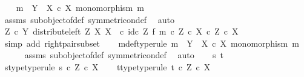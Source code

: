 \begin{isabellebody}
\ \ \isamarkupfalse%
\ {\isachardoublequoteopen}m\ {\isacharcolon}{\kern0pt}\ Y\ {\isasymrightarrow}\ X\ {\isasymtimes}\isactrlsub c\ X{\isachardoublequoteclose}\ {\isachardoublequoteopen}monomorphism\ m{\isachardoublequoteclose}\isanewline
\ \ \ \ \isamarkupfalse%
\ assms\ subobject{\isacharunderscore}{\kern0pt}of{\isacharunderscore}{\kern0pt}def{}\ symmetric{\isacharunderscore}{\kern0pt}on{\isacharunderscore}{\kern0pt}def\ \isamarkupfalse%
\ auto\isanewline
\ \ \isamarkupfalse%
\ \isamarkupfalse%
\ {\isachardoublequoteopen}{\isacharparenleft}{\kern0pt}Z\ {\isasymtimes}\isactrlsub c\ Y{\isacharcomma}{\kern0pt}\ distribute{\isacharunderscore}{\kern0pt}left\ Z\ X\ X\ \ {\isasymcirc}\isactrlsub c\ {\isacharparenleft}{\kern0pt}id\isactrlsub c\ Z\ {\isasymtimes}\isactrlsub f\ m{\isacharparenright}{\kern0pt}{\isacharparenright}{\kern0pt}\ {\isasymsubseteq}\isactrlsub c\ {\isacharparenleft}{\kern0pt}Z\ {\isasymtimes}\isactrlsub c\ X{\isacharparenright}{\kern0pt}\ {\isasymtimes}\isactrlsub c\ Z\ {\isasymtimes}\isactrlsub c\ X{\isachardoublequoteclose}\isanewline
\ \ \ \ \isamarkupfalse%
\ {\isacharparenleft}{\kern0pt}simp\ add{\isacharcolon}{\kern0pt}\ right{\isacharunderscore}{\kern0pt}pair{\isacharunderscore}{\kern0pt}subset{\isacharparenright}{\kern0pt}\isanewline
{}\isamarkupfalse%
\isanewline
\ \ \isamarkupfalse%
\ m{\isacharunderscore}{\kern0pt}def{\isacharbrackleft}{\kern0pt}type{\isacharunderscore}{\kern0pt}rule{\isacharbrackright}{\kern0pt}{\isacharcolon}{\kern0pt}\ {\isachardoublequoteopen}m\ {\isacharcolon}{\kern0pt}\ Y\ {\isasymrightarrow}\ X\ {\isasymtimes}\isactrlsub c\ X{\isachardoublequoteclose}\ {\isachardoublequoteopen}monomorphism\ m{\isachardoublequoteclose}\isanewline
\ \ \ \ \isamarkupfalse%
\ assms\ subobject{\isacharunderscore}{\kern0pt}of{\isacharunderscore}{\kern0pt}def{}\ symmetric{\isacharunderscore}{\kern0pt}on{\isacharunderscore}{\kern0pt}def\ \isamarkupfalse%
\ auto\isanewline
\isanewline
\ \ \isamarkupfalse%
\ s\ t\ \isanewline
\ \ \isamarkupfalse%
\ s{\isacharunderscore}{\kern0pt}type{\isacharbrackleft}{\kern0pt}type{\isacharunderscore}{\kern0pt}rule{\isacharbrackright}{\kern0pt}{\isacharcolon}{\kern0pt}\ {\isachardoublequoteopen}s\ {\isasymin}\isactrlsub c\ Z\ {\isasymtimes}\isactrlsub c\ X{\isachardoublequoteclose}\isanewline
\ \ \isamarkupfalse%
\ t{\isacharunderscore}{\kern0pt}type{\isacharbrackleft}{\kern0pt}type{\isacharunderscore}{\kern0pt}rule{\isacharbrackright}{\kern0pt}{\isacharcolon}{\kern0pt}\ {\isachardoublequoteopen}t\ {\isasymin}\isactrlsub c\ Z\ {\isasymtimes}\isactrlsub c\ X{\isachardoublequoteclose}\isanewline

\end{isabellebody}
